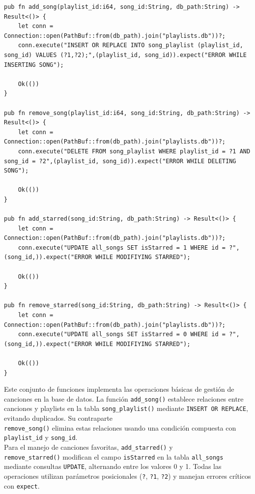 \documentclass[11pt, a4paper]{article}
\begin{document}
            \begin{lstlisting}[caption={Operaciones CRUD canciones}]
pub fn add_song(playlist_id:i64, song_id:String, db_path:String) -> Result<()> {
    let conn = Connection::open(PathBuf::from(db_path).join("playlists.db"))?;
    conn.execute("INSERT OR REPLACE INTO song_playlist (playlist_id, song_id) VALUES (?1,?2);",(playlist_id, song_id)).expect("ERROR WHILE INSERTING SONG");

    Ok(())
}

pub fn remove_song(playlist_id:i64, song_id:String, db_path:String) -> Result<()> {
    let conn = Connection::open(PathBuf::from(db_path).join("playlists.db"))?;
    conn.execute("DELETE FROM song_playlist WHERE playlist_id = ?1 AND song_id = ?2",(playlist_id, song_id)).expect("ERROR WHILE DELETING SONG");

    Ok(())
}

pub fn add_starred(song_id:String, db_path:String) -> Result<()> {
    let conn = Connection::open(PathBuf::from(db_path).join("playlists.db"))?;
    conn.execute("UPDATE all_songs SET isStarred = 1 WHERE id = ?",(song_id,)).expect("ERROR WHILE MODIFIYING STARRED");

    Ok(())
}

pub fn remove_starred(song_id:String, db_path:String) -> Result<()> {
    let conn = Connection::open(PathBuf::from(db_path).join("playlists.db"))?;
    conn.execute("UPDATE all_songs SET isStarred = 0 WHERE id = ?",(song_id,)).expect("ERROR WHILE MODIFIYING STARRED");

    Ok(())
}
            \end{lstlisting}

            Este conjunto de funciones implementa las operaciones básicas de gestión de canciones en la base de datos. La función \texttt{add\_song()} establece relaciones entre canciones y playlists en la tabla \texttt{song\_playlist()} mediante \texttt{INSERT OR REPLACE}, evitando duplicados. Su contraparte \\ \texttt{remove\_song()} elimina estas relaciones usando una condición compuesta con \texttt{playlist\_id} y \texttt{song\_id}. \\
            
            Para el manejo de canciones favoritas, \texttt{add\_starred()} y \\ \texttt{remove\_starred()} modifican el campo \texttt{isStarred} en la tabla \texttt{all\_songs} mediante consultas \texttt{UPDATE}, alternando entre los valores 0 y 1. Todas las operaciones utilizan parámetros posicionales (\texttt{?}, \texttt{?1}, \texttt{?2}) y manejan errores críticos con \texttt{expect}. \\
\end{document}
